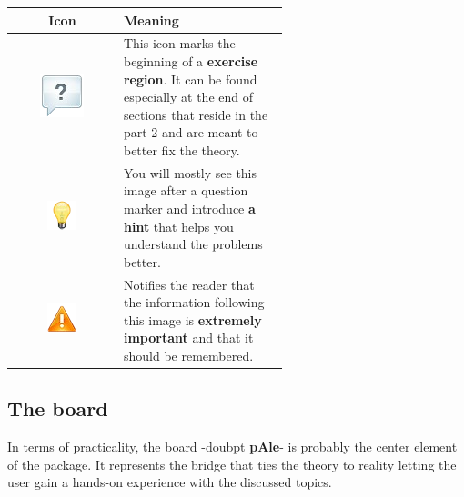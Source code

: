 \documentclass[12pt, a4paper]{book}
\begin{document}
\renewcommand{\arraystretch}{1.8}
\begin{tabular}{c | m{0.6\linewidth} }
  \centering
  Icon & Meaning \\ \hline
    
  \begin{minipage}[c][3cm][c]{0.2\textwidth}
    \includegraphics[scale=1.0]{./img/altele/questions_marker.png}
  \end{minipage} 
  & 
  This icon marks the beginning of a \textbf{exercise region}. It can be found especially at the end of sections that reside in the part 2 and are meant to better fix the theory. \\ \hline

  \begin{minipage}[c][3cm][c]{0.2\textwidth}
    \includegraphics[scale=1.0]{./img/altele/clue_marker.png}
  \end{minipage} 
  &
  You will mostly see this image after a question marker and introduce \textbf{a hint} that helps you understand the problems better. \\ \hline
 
  \begin{minipage}[c][3cm][c]{0.2\textwidth}
    \includegraphics[scale=1.0]{./img/altele/important_marker.png}
  \end{minipage} 
  &
  Notifies the reader that the information following this image is \textbf{extremely important} and that it should be remembered.\\
\end{tabular}
\renewcommand{\arraystretch}{1.0}

\subsection{The board}

In terms of practicality, the board -doubpt \textbf{pAle}- is probably the center element of the package. It represents the bridge that ties the theory to reality letting the user gain a hands-on experience with the discussed topics.
\end{document}
